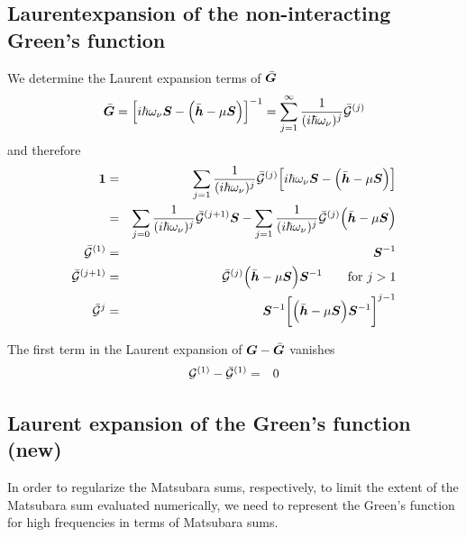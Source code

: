 \documentclass[11pt,a4paper]{report}
\begin{document}
\subsection{Laurentexpansion of the non-interacting Green's function}
We determine the Laurent expansion terms of $\bar{\bm{G}}$
\begin{eqnarray}
\bar{\bm{G}}=\Bigl[i\hbar\omega_\nu\bm{S}-\Bigl(\bar{\bm{h}}-\mu\bm{S}\Bigr)
\Bigr]^{-1}
=\sum_{j=1}^\infty\frac{1}{(i\hbar\omega_\nu)^j}
\bar{\mathcal{\bm{G}}}^{(j)}
\end{eqnarray}
and therefore
\begin{eqnarray}
\bm{1}
&=&
\sum_{j=1}\frac{1}{(i\hbar\omega_\nu)^j}\bar{\mathcal{\bm{G}}}^{(j)}
\Bigl[i\hbar\omega_\nu\bm{S}-\Bigl(\bar{\bm{h}}-\mu\bm{S}\Bigr)
\Bigr]
\nonumber\\
&=&
\sum_{j=0}\frac{1}{(i\hbar\omega_\nu)^{j}}\bar{\mathcal{\bm{G}}}^{(j+1)}\bm{S}
-\sum_{j=1}\frac{1}{(i\hbar\omega_\nu)^j}\bar{\mathcal{\bm{G}}}^{(j)}\Bigl(\bar{\bm{h}}-\mu\bm{S}\Bigr)
\nonumber\\
\bar{\mathcal{\bm{G}}}^{(1)}
&=&\bm{S}^{-1}
\nonumber\\
\bar{\mathcal{\bm{G}}}^{(j+1)}
&=&\bar{\mathcal{\bm{G}}}^{(j)}\Bigl(\bar{\bm{h}}-\mu\bm{S}\Bigr)\bm{S}^{-1}
\qquad\text{for $j>1$}
\nonumber\\
\bar{\mathcal{\bm{G}}}^{j}&=&
\bm{S}^{-1}\biggl[\Bigl(\bar{\bm{h}}-\mu\bm{S}\Bigr)\bm{S}^{-1}\biggr]^{j-1}
\label{eq:laurentexpansionofgbar}
\end{eqnarray}

The first term in the Laurent expansion of $\bm{G}-\bar{\bm{G}}$ vanishes
\begin{eqnarray}
\mathcal{\bm{G}}^{(1)}-\bar{\mathcal{\bm{G}}}^{(1)}&=&0
\end{eqnarray}

\subsection{Laurent expansion of the Green's function (new)}
\label{sec:laurentgreen}
In order to regularize the Matsubara sums, respectively, to limit the
extent of the Matsubara sum evaluated numerically, we need to
represent the Green's function for high frequencies in terms of
Matsubara sums.
\end{document}
